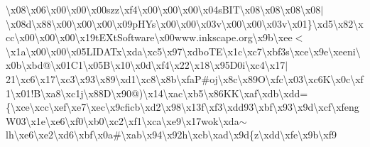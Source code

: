 \textbackslash{}x08\textbackslash{}x06\textbackslash{}x00\textbackslash{}x00\textbackslash{}x00szz\textbackslash{}xf4\textbackslash{}x00\textbackslash{}x00\textbackslash{}x00\textbackslash{}x04s\+B\+I\+T\textbackslash{}x08\textbackslash{}x08\textbackslash{}x08\textbackslash{}x08$\vert$\textbackslash{}x08d\textbackslash{}x88\textbackslash{}x00\textbackslash{}x00\textbackslash{}x00\textbackslash{}x09p\+H\+Ys\textbackslash{}x00\textbackslash{}x00\textbackslash{}x03v\textbackslash{}x00\textbackslash{}x00\textbackslash{}x03v\textbackslash{}x01\}\textbackslash{}xd5\textbackslash{}x82\textbackslash{}xcc\textbackslash{}x00\textbackslash{}x00\textbackslash{}x00\textbackslash{}x19t\+E\+Xt\+Software\textbackslash{}x00www.\+inkscape.\+org\textbackslash{}x9b\textbackslash{}xee$<$\textbackslash{}x1a\textbackslash{}x00\textbackslash{}x00\textbackslash{}x05\+L\+I\+D\+A\+Tx\textbackslash{}xda\textbackslash{}xc5\textbackslash{}x97\textbackslash{}xdbo\+T\+E\textbackslash{}x1c\textbackslash{}xc7\textbackslash{}xbf3s\textbackslash{}xce\textbackslash{}x9e\textbackslash{}xeeni\textbackslash{}x0b\textbackslash{}xbd@\textbackslash{}x01\+C1\textbackslash{}x05\+B\textbackslash{}x10\textbackslash{}x0d\textbackslash{}xf4\textbackslash{}x22\textbackslash{}x18\textbackslash{}x95\+D0i\textbackslash{}xc4\textbackslash{}x17$\vert$21\textbackslash{}xc6\textbackslash{}x17\textbackslash{}xc3\textbackslash{}x93\textbackslash{}x89\textbackslash{}xd1\textbackslash{}xc8\textbackslash{}x8b\textbackslash{}xfa\+P\#oj\textbackslash{}x8c\textbackslash{}x89\+O\textbackslash{}xfc\textbackslash{}x03\textbackslash{}xc6\+K\textbackslash{}x0c\textbackslash{}xf1\textbackslash{}x01!\+B\textbackslash{}xa8\textbackslash{}xc1j\textbackslash{}x88\+D\textbackslash{}x90@)\textbackslash{}x14\textbackslash{}xac\textbackslash{}xb5\textbackslash{}x86\+K\+K\textbackslash{}xaf\textbackslash{}xdb\textbackslash{}xdd=\{\textbackslash{}xce\textbackslash{}xcc\textbackslash{}xef\textbackslash{}xe7\textbackslash{}xec\textbackslash{}x9cficb\textbackslash{}xd2\textbackslash{}x98\textbackslash{}x13f\textbackslash{}xf3\textbackslash{}xdd93\textbackslash{}xbf\textbackslash{}x93\textbackslash{}x9d\textbackslash{}xcf\textbackslash{}xfeng\+W03\textbackslash{}x1e\textbackslash{}xe6\textbackslash{}xf0\textbackslash{}xb0\textbackslash{}xc2\textbackslash{}xf1\textbackslash{}xca\textbackslash{}xe9\textbackslash{}x17wok\textbackslash{}xda$\sim$lh\textbackslash{}xe6\textbackslash{}xe2\textbackslash{}xd6\textbackslash{}xbf\textbackslash{}x0a\#\textbackslash{}xab\textbackslash{}x94\textbackslash{}x92h\textbackslash{}xcb\textbackslash{}xad\textbackslash{}x9d\{z\textbackslash{}xdd\textbackslash{}xfe\textbackslash{}x9b\textbackslash{}xf9 